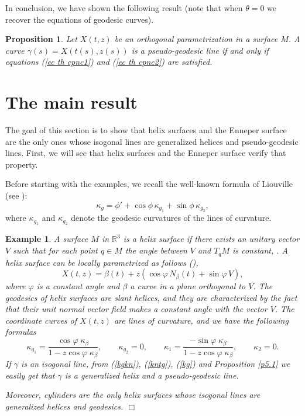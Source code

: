 \documentclass[11pt,a4paper]{article}
\def\R#1{\ensuremath{\mathbb{R}^{#1}}}
\def\g{\gamma}
\newtheorem{prop}[theo]{Proposition}
\newtheorem{example}{Example}
\begin{document}
In conclusion, we have shown the following result (note that when $\theta=0$ we recover the equations of geodesic curves).

\begin{prop}
Let $X(t,z)$ be an orthogonal parametrization in a surface $M$. A curve $\g(s)=X(t(s),z(s))$ is a pseudo-geodesic line if and only if equations (\ref{ec th cpnc1}) and (\ref{ec th cpnc2}) are satisfied.
\end{prop}

\section{The main result}
\label{s:MR}

The goal of this section is to show that helix surfaces and the Enneper surface are the only ones whose isogonal lines are generalized helices and pseudo-geodesic lines. First, we will see that helix surfaces and the Enneper surface verify that property.

Before starting with the examples, we recall the well-known formula of Liouville (see \cite[p. 253]{DoCarmo76}):
\begin{equation}
\kappa_g = \phi'+\cos\phi\,\kappa_{g_1}+\sin\phi\,\kappa_{g_2}, \label{kg}
\end{equation}
where $\kappa_{g_1}$ and $\kappa_{g_2}$ denote the geodesic curvatures of the lines of curvature.

\begin{example}\label{ex1}
A surface $M$ in $\R3$ is a \emph{helix surface} if there exists an unitary vector $V$ such that for each point $q\in M$ the angle between $V$ and $T_qM$ is constant, \cite{DSRH09}. A helix surface can be locally parametrized as follows (\cite{DSRH09,LO16a}),
\begin{equation}\label{ParamtSupHelice}
X(t,z)=\beta(t)+z\left(\cos\varphi\,N_\beta(t)+\sin\varphi\, V\right),
\end{equation}
where $\varphi$ is a constant angle and $\beta$ a curve in a plane orthogonal to $V$. The geodesics of helix surfaces are slant helices, and they are characterized by the fact that their unit normal vector field makes a constant angle with the vector $V$. The coordinate curves of $X(t,z)$ are lines of curvature, and we have the following formulas
\[
\kappa_{g_1}=\frac{\cos\varphi\;\kappa_\beta}{1-z\cos\varphi\;\kappa_\beta},\qquad \kappa_{g_2}=0, \qquad\kappa_{1}=\frac{-\sin\varphi\;\kappa_\beta}{1-z\cos\varphi\;\kappa_\beta},\qquad \kappa_{2}=0.
\]
If $\gamma$ is an isogonal line, from (\ref{kgkn}), (\ref{kntg}), (\ref{kg}) and Proposition \ref{p5.1} we easily get that $\g$ is a generalized helix and a pseudo-geodesic line.

Moreover, cylinders are the only helix surfaces whose  isogonal lines are generalized helices and geodesics.
\hfill$\Box$
\end{example}
\end{document}
